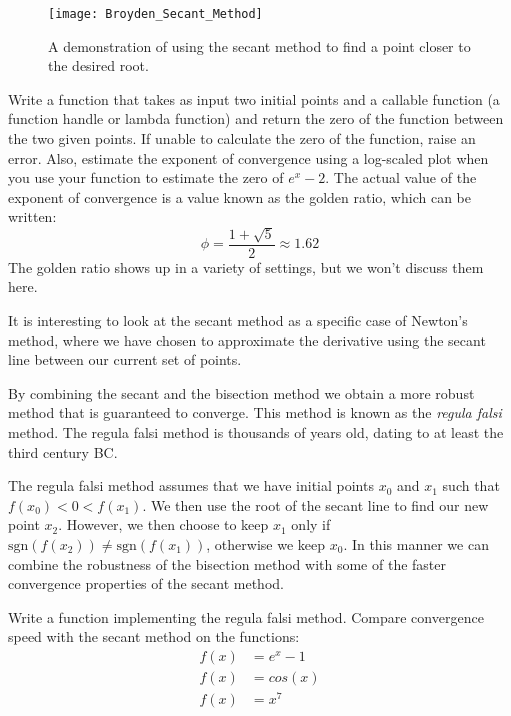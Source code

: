 \begin{figure}
\begin{center}
\texttt{[image: Broyden\_Secant\_Method]}
\caption{A demonstration of using the secant method to find a point closer to the desired root.}
\label{Fig:Secant}
\end{center}
\end{figure}

\begin{problem}
Write a function that takes as input two initial points and a callable function (a function handle or lambda function) and return the zero of the function between the two given points.  If unable to calculate the zero of the function, raise an error.  Also, estimate the exponent of convergence using a log-scaled plot when you use your function to estimate the zero of $e^x-2$. The actual value of the exponent of convergence is a value known as the golden ratio, which can be written:
\[
\phi = \frac{1 + \sqrt{5}}{2} \approx 1.62
\]
The golden ratio shows up in a variety of settings, but we won't discuss them here.
\end{problem}

It is interesting to look at the secant method as a specific case of Newton's method, where we have chosen to approximate the derivative using the secant line between our current set of points.

By combining the secant and the bisection method we obtain a more robust method that is guaranteed to converge. This method is known as the \emph{regula falsi} method. The regula falsi method is thousands of years old, dating to at least the third century BC.

The regula falsi method assumes that we have initial points $x_0$ and $x_1$ such that $f(x_0) < 0 < f(x_1)$. We then use the root of the secant line to find our new point $x_2$. However, we then choose to keep $x_1$ only if $\mbox{sgn}(f(x_2)) \neq \mbox{sgn}(f(x_1))$, otherwise we keep $x_0$. In this manner we can combine the robustness of the bisection method with some of the faster convergence properties of the secant method.

\begin{problem}
Write a function implementing the regula falsi method. Compare convergence speed with the secant method on the functions:
\begin{align*}
f(x) &= e^x-1\\
f(x) &= cos(x)\\
f(x) &= x^7\\
\end{align*}
\end{problem}

